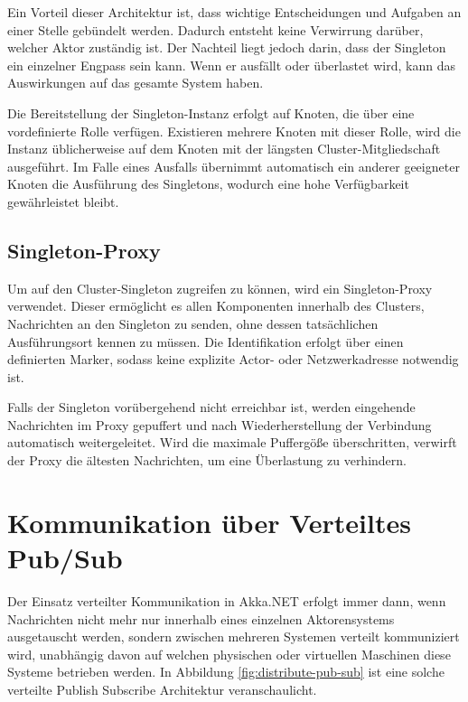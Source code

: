 Ein Vorteil dieser Architektur ist, dass wichtige Entscheidungen und Aufgaben an einer Stelle gebündelt werden. 
Dadurch entsteht keine Verwirrung darüber, welcher Aktor zuständig ist. Der Nachteil liegt jedoch darin, dass der 
Singleton ein einzelner Engpass sein kann. Wenn er ausfällt oder überlastet wird, kann das Auswirkungen auf das 
gesamte System haben.

Die Bereitstellung der Singleton-Instanz erfolgt auf Knoten, die über eine vordefinierte Rolle verfügen. Existieren 
mehrere Knoten mit dieser Rolle, wird die Instanz üblicherweise auf dem Knoten mit der längsten Cluster-Mitgliedschaft 
ausgeführt. Im Falle eines Ausfalls übernimmt automatisch ein anderer geeigneter Knoten die Ausführung des Singletons, 
wodurch eine hohe Verfügbarkeit gewährleistet bleibt.
\parencite{getakka_singleton}

\subsection{Singleton-Proxy}

Um auf den Cluster-Singleton zugreifen zu können, wird ein Singleton-Proxy verwendet. Dieser ermöglicht es allen 
Komponenten innerhalb des Clusters, Nachrichten an den Singleton zu senden, ohne dessen tatsächlichen Ausführungsort 
kennen zu müssen. Die Identifikation erfolgt über einen definierten Marker, sodass keine explizite Actor- oder 
Netzwerkadresse notwendig ist.

Falls der Singleton vorübergehend nicht erreichbar ist, werden eingehende Nachrichten im Proxy gepuffert und nach 
Wiederherstellung der Verbindung automatisch weitergeleitet. Wird die maximale Puffergöße überschritten, verwirft 
der Proxy die ältesten Nachrichten, um eine Überlastung zu verhindern.
\parencite{getakka_singleton}

\section{Kommunikation über Verteiltes Pub/Sub}

Der Einsatz verteilter Kommunikation in Akka.NET erfolgt immer dann, wenn Nachrichten nicht mehr nur innerhalb 
eines einzelnen Aktorensystems ausgetauscht werden, sondern zwischen mehreren Systemen verteilt kommuniziert wird, 
unabhängig davon auf welchen physischen oder virtuellen Maschinen diese Systeme betrieben werden. In Abbildung 
\ref{fig:distribute-pub-sub} ist eine solche verteilte Publish Subscribe Architektur veranschaulicht.

